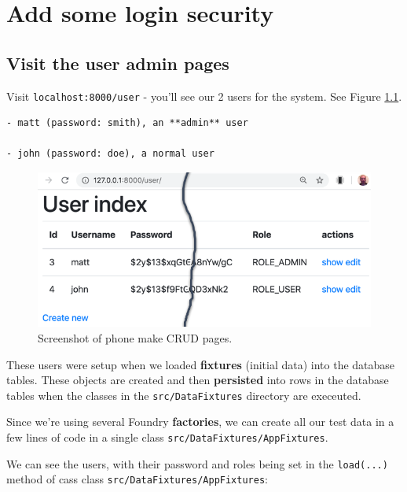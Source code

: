 \documentclass[a4paperpaper,openright]{book}
\begin{document}
\hypertarget{add-some-login-security}{%
\chapter{Add some login security}\label{add-some-login-security}}

\hypertarget{visit-the-user-admin-pages}{%
\section{Visit the user admin pages}\label{visit-the-user-admin-pages}}

Visit \texttt{localhost:8000/user} - you'll see our 2 users for the
system. See Figure \ref{user_index}.

\begin{verbatim}
- matt (password: smith), an **admin** user

- john (password: doe), a normal user
\end{verbatim}

\begin{figure}
\centering
\includegraphics[width=1\textwidth,height=\textheight]{./tex2pdf.-1b59354caa481da0/802ac6fcfe8735aad07e9f15b9bdd179a6b64592.png}
\caption{Screenshot of phone make CRUD pages.\label{user_index}}
\end{figure}

These users were setup when we loaded \textbf{fixtures} (initial data)
into the database tables. These objects are created and then
\textbf{persisted} into rows in the database tables when the classes in
the \texttt{src/DataFixtures} directory are execeuted.

Since we're using several Foundry \textbf{factories}, we can create all
our test data in a few lines of code in a single class
\texttt{src/DataFixtures/AppFixtures}.

We can see the users, with their password and roles being set in the
\texttt{load(...)} method of cass class
\texttt{src/DataFixtures/AppFixtures}:
\end{document}
